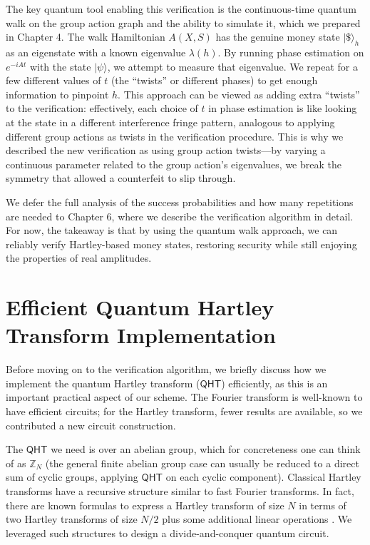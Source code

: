 \documentclass[12pt]{report}
\newcommand{\qht}{\mathsf{QHT}}
\begin{document}
The key quantum tool enabling this verification is the continuous-time quantum walk on the group action graph and the ability to simulate it, which we prepared in Chapter 4. The walk Hamiltonian $A(X,S)$ has the genuine money state $|\$\rangle_h$ as an eigenstate with a known eigenvalue $\lambda(h)$. By running phase estimation on $e^{-iA t}$ with the state $|\psi\rangle$, we attempt to measure that eigenvalue. We repeat for a few different values of $t$ (the “twists” or different phases) to get enough information to pinpoint $h$. This approach can be viewed as adding extra “twists” to the verification: effectively, each choice of $t$ in phase estimation is like looking at the state in a different interference fringe pattern, analogous to applying different group actions as twists in the verification procedure. This is why we described the new verification as using group action twists—by varying a continuous parameter related to the group action’s eigenvalues, we break the symmetry that allowed a counterfeit to slip through.

We defer the full analysis of the success probabilities and how many repetitions are needed to Chapter 6, where we describe the verification algorithm in detail. For now, the takeaway is that by using the quantum walk approach, we can reliably verify Hartley-based money states, restoring security while still enjoying the properties of real amplitudes.

\section{Efficient Quantum Hartley Transform Implementation}\label{sec:efficient_qht}
Before moving on to the verification algorithm, we briefly discuss how we implement the quantum Hartley transform ($\qht$) efficiently, as this is an important practical aspect of our scheme. The Fourier transform is well-known to have efficient circuits; for the Hartley transform, fewer results are available, so we contributed a new circuit construction.

The $\qht$ we need is over an abelian group, which for concreteness one can think of as $\mathbb{Z}_N$ (the general finite abelian group case can usually be reduced to a direct sum of cyclic groups, applying $\qht$ on each cyclic component). Classical Hartley transforms have a recursive structure similar to fast Fourier transforms. In fact, there are known formulas to express a Hartley transform of size $N$ in terms of two Hartley transforms of size $N/2$ plus some additional linear operations \cite{Bracewell1984}. We leveraged such structures to design a divide-and-conquer quantum circuit.
\end{document}
